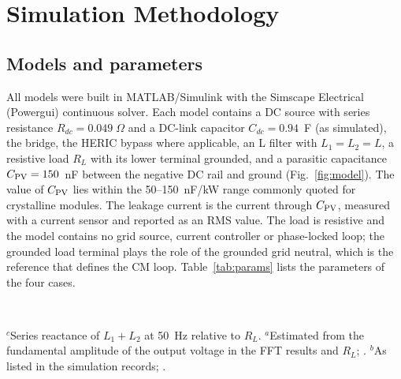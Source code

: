 \section{Simulation Methodology}
\label{sec:method}

\subsection{Models and parameters}
All models were built in MATLAB/Simulink with the Simscape Electrical (Powergui) continuous solver. Each model contains a DC source with series resistance $R_{dc}=0.049\;\Omega$ and a DC-link capacitor $C_{dc}=0.94$~F (as simulated), the bridge, the HERIC bypass where applicable, an L filter with $L_1=L_2=L$, a resistive load $R_L$ with its lower terminal grounded, and a parasitic capacitance $\Cpv=150$~nF between the negative DC rail and ground (Fig.~\ref{fig:model}). The value of $C_{\mathrm{PV}}$ lies within the 50--150~nF/kW range commonly quoted for crystalline modules. The leakage current is the current through $C_{\mathrm{PV}}$, measured with a current sensor and reported as an RMS value. The load is resistive and the model contains no grid source, current controller or phase-locked loop; the grounded load terminal plays the role of the grounded grid neutral, which is the reference that defines the CM loop. Table~\ref{tab:params} lists the parameters of the four cases.

\begin{table}[!t]
\renewcommand{\arraystretch}{1.2}
\caption{Simulation parameters of the four cases ($\Cpv=150$~nF, $C_{dc}=0.94$~F, $R_{dc}=0.049\;\Omega$ in all cases)}
\label{tab:params}
\centering
\footnotesize
{}\\[2pt]
\begin{minipage}{0.97\textwidth}\footnotesize
$^{c}$Series reactance of $L_1+L_2$ at 50~Hz relative to $R_L$. $^{a}$Estimated from the fundamental amplitude of the output voltage in the FFT results and $R_L$; . $^{b}$As listed in the simulation records; .
\end{minipage}
\end{table}

